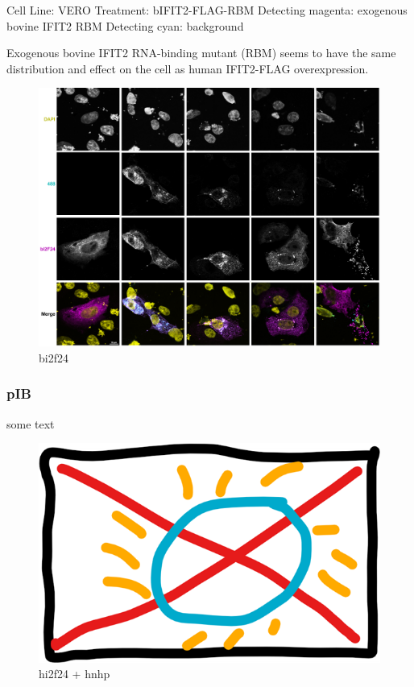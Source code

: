 Cell Line: VERO
Treatment: bIFIT2-FLAG-RBM
Detecting magenta: exogenous bovine IFIT2 RBM
Detecting cyan: background

Exogenous bovine IFIT2 RNA-binding mutant (RBM) seems to have the same distribution and effect on the cell as human IFIT2-FLAG overexpression.

\begin{figure}
    \centering
    \includegraphics[width=1\linewidth]{10. Chapter 5/Figs/04. IFIT2-mutant confocal/01. bi2f24.png}
    \caption[bi2f24]{bi2f24}
    \label{bi2f24}
\end{figure}

\subsubsection{pIB}
some text

\begin{figure}
    \centering
    \includegraphics[width=0.5\linewidth]{10. Chapter 5//Figs//04. IFIT2-mutant confocal/00. placeholder.png}
    \caption[hi2f24 + hnhp]{hi2f24 + hnhp}
    \label{hi2f24 + hnhp}
\end{figure}


